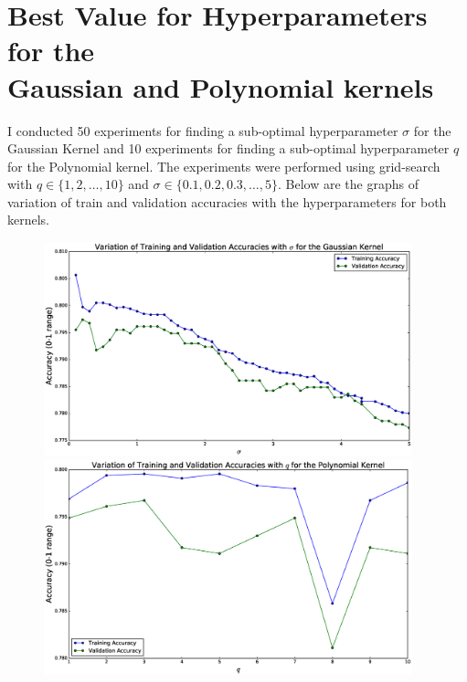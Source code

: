 \documentclass{article}
\begin{document}
\section*{Best Value for Hyperparameters for the \\
Gaussian and Polynomial kernels}
\begin{flushleft}
I conducted 50 experiments for finding a sub-optimal hyperparameter \(\sigma\) for the Gaussian Kernel and 10 experiments for finding a sub-optimal hyperparameter \(q\) for the Polynomial kernel. The experiments were performed using grid-search with \(q \in \{1, 2, \ldots, 10\}\) and \(\sigma \in \{0.1, 0.2, 0.3, \ldots, 5\}\). Below are the graphs of variation of train and validation accuracies with the hyperparameters for both kernels.

\begin{figure}[H]
\begin{minipage}{0.45\linewidth}
\centering
\includegraphics[width=0.95\textwidth]{./images/gaussian.eps}
\end{minipage}
\hfill
\begin{minipage}{0.45\linewidth}
\centering
\includegraphics[width=0.95\textwidth]{./images/polynomial.eps}
\end{minipage}
\end{figure}
\end{flushleft}
\end{document}
